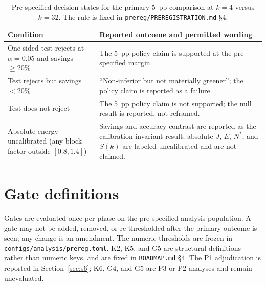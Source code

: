 \documentclass[a4paper,fleqn]{cas-sc}
\begin{document}
\begin{table}[pos=htbp]
  \centering
  \caption{Pre-specified decision states for the primary 5~pp comparison at $k=4$ versus
  $k=32$. The rule is fixed in \texttt{prereg/PREREGISTRATION.md} \S4.}
  \label{tab:decision}
  \begin{tabularx}{\textwidth}{>{\raggedright\arraybackslash}p{5.4cm}>{\raggedright\arraybackslash}X}
    \toprule
    \textbf{Condition} & \textbf{Reported outcome and permitted wording} \\
    \midrule
    One-sided test rejects at $\alpha=0.05$ and savings $\ge20\%$ &
    The 5~pp policy claim is supported at the pre-specified margin. \\
    Test rejects but savings $<20\%$ &
    ``Non-inferior but not materially greener''; the policy claim is reported as a failure. \\
    Test does not reject &
    The 5~pp policy claim is not supported; the null result is reported, not reframed. \\
    Absolute energy uncalibrated (any block factor outside $[0.8,1.4]$) &
    Savings and accuracy contrast are reported as the calibration-invariant result; absolute
    $J$, $E$, $N^{*}$, and $S(k)$ are labeled uncalibrated and are not claimed. \\
    \bottomrule
  \end{tabularx}
\end{table}

\section{Gate definitions}\label{sec:s3}

Gates are evaluated once per phase on the pre-specified analysis population. A gate may not be
added, removed, or re-thresholded after the primary outcome is seen; any change is an amendment.
The numeric thresholds are frozen in \texttt{configs/analysis/prereg.toml}. K2, K5, and G5 are
structural definitions rather than numeric keys, and are fixed in \texttt{ROADMAP.md} \S4. The
P1 adjudication is reported in Section~\ref{sec:s6}; K6, G4, and G5 are P3 or P2 analyses and
remain unevaluated.
\end{document}

